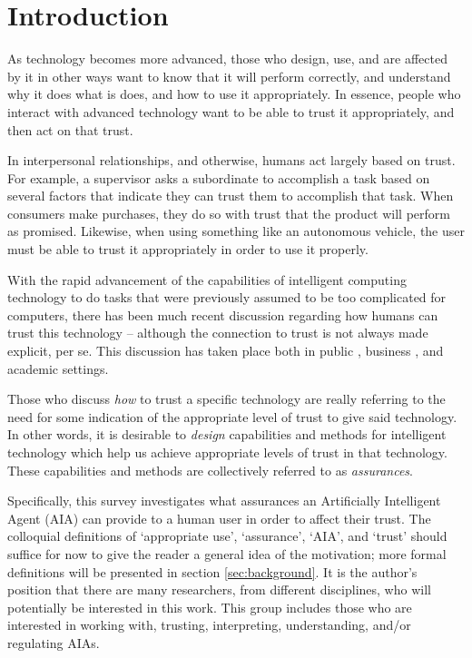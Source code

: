 \section{Introduction}
    As technology becomes more advanced, those who design, use, and are affected by it in other ways want to know that it will perform correctly, and understand why it does what is does, and how to use it appropriately. In essence, people who interact with advanced technology want to be able to trust it appropriately, and then act on that trust.

    In interpersonal relationships, and otherwise, humans act largely based on trust. For example, a supervisor asks a subordinate to accomplish a task based on several factors that indicate they can trust them to accomplish that task. When consumers make purchases, they do so with trust that the product will perform as promised. Likewise, when using something like an autonomous vehicle, the user must be able to trust it appropriately in order to use it properly.

    With the rapid advancement of the capabilities of intelligent computing technology to do tasks that were previously assumed to be too complicated for computers, there has been much recent discussion regarding how humans can trust this technology -- although the connection to trust is not always made explicit, per se. This discussion has taken place both in public \cite{Spectrum2016-jv,DeSteno2014-cq,Cranz2017-yh,Cassel2017-tn,Danks2017-sb}, business \cite{Banavar2016-nm, Khosravi2016-ke,Moody2017-vd,Rudnitsky2017-in,Benioff2016-tc}, and academic \cite{Groom2007-bz,Lloyd2014-bb,Goodrum_2016-fm,Foley2017-qj,Ghahramani2015-yq,Castelvecchi2016-mr} settings.

    Those who discuss \emph{how} to trust a specific technology are really referring to the need for some indication of the appropriate level of trust to give said technology. In other words, it is desirable to \emph{design} capabilities and methods for intelligent technology which help us achieve appropriate levels of trust in that technology. These capabilities and methods are collectively referred to as \emph{assurances}. %
    
    Specifically, this survey investigates what assurances an Artificially Intelligent Agent (AIA) can provide to a human user in order to affect their trust. The colloquial definitions of `appropriate use', `assurance', `AIA', and `trust' should suffice for now to give the reader a general idea of the motivation; more formal definitions will be presented in section \ref{sec:background}. It is the author's position that there are many researchers, from different disciplines, who will potentially be interested in this work. This group includes those who are interested in working with, trusting, interpreting, understanding, and/or regulating AIAs.

